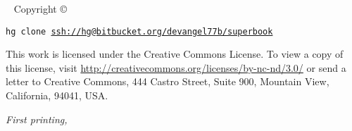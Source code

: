 



\newpage
\begin{fullwidth}
~\vfill
\thispagestyle{empty}
\setlength{\parindent}{0pt}
\setlength{\parskip}{\baselineskip}
Copyright \copyright\ \the\year\ \thanklessauthor

\par{}

\par{}

\par\texttt{hg clone \url{ssh://hg@bitbucket.org/devangel77b/superbook}}

\par This work is licensed under the Creative Commons  License. To view a copy of this license, visit \url{http://creativecommons.org/licenses/by-nc-nd/3.0/} or send a letter to Creative Commons, 444 Castro Street, Suite 900, Mountain View, California, 94041, USA. 

\par\textit{First printing, \monthyear}
\end{fullwidth}
